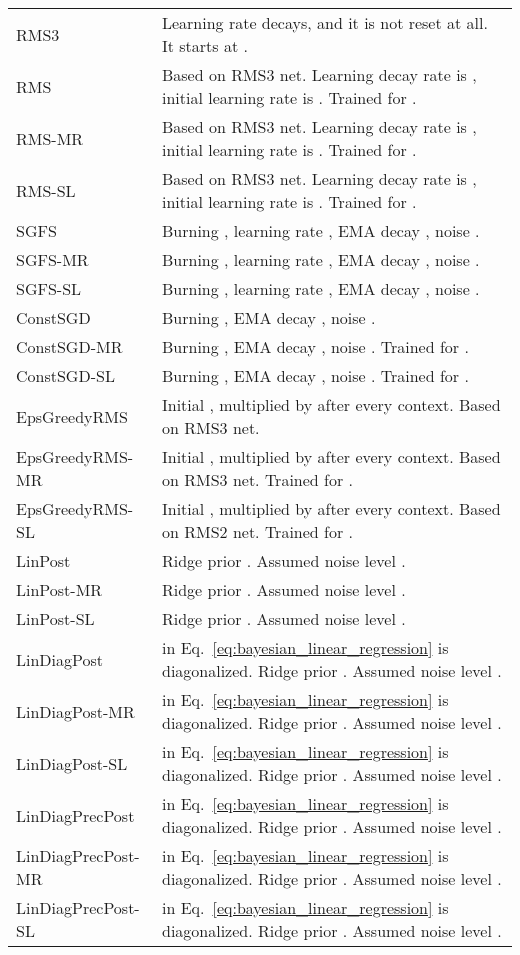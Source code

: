 \documentclass{article} \usepackage{iclr2018_conference,times}
\begin{document}
\begin{table}[ht]
\begin{adjustbox}{center}
\begin{tabular}{ll}
RMS3 & Learning rate decays, and it is not reset at all. It starts at . \\
RMS & Based on RMS3 net. Learning decay rate is , initial learning rate is . Trained for . \\
RMS-MR & Based on RMS3 net. Learning decay rate is , initial learning rate is . Trained for . \\
RMS-SL & Based on RMS3 net. Learning decay rate is , initial learning rate is . Trained for . \\
SGFS & Burning , learning rate , EMA decay , noise . \\
SGFS-MR & Burning , learning rate , EMA decay , noise . \\
SGFS-SL & Burning , learning rate , EMA decay , noise . \\
ConstSGD & Burning , EMA decay , noise . \\
ConstSGD-MR & Burning , EMA decay , noise . Trained for . \\
ConstSGD-SL & Burning , EMA decay , noise . Trained for . \\
EpsGreedyRMS & Initial , multiplied by  after every context. Based on RMS3 net. \\
EpsGreedyRMS-MR & Initial , multiplied by  after every context. Based on RMS3 net. Trained for . \\
EpsGreedyRMS-SL & Initial , multiplied by  after every context. Based on RMS2 net. Trained for . \\
LinPost & Ridge prior . Assumed noise level . \\
LinPost-MR & Ridge prior . Assumed noise level . \\
LinPost-SL & Ridge prior . Assumed noise level . \\
LinDiagPost &  in Eq.~\ref{eq:bayesian_linear_regression} is diagonalized.  Ridge prior . Assumed noise level . \\
LinDiagPost-MR &  in Eq.~\ref{eq:bayesian_linear_regression} is diagonalized.  Ridge prior . Assumed noise level . \\
LinDiagPost-SL &  in Eq.~\ref{eq:bayesian_linear_regression} is diagonalized.  Ridge prior . Assumed noise level . \\
LinDiagPrecPost &  in Eq.~\ref{eq:bayesian_linear_regression} is diagonalized.  Ridge prior . Assumed noise level . \\
LinDiagPrecPost-MR &  in Eq.~\ref{eq:bayesian_linear_regression} is diagonalized.  Ridge prior . Assumed noise level . \\
LinDiagPrecPost-SL &  in Eq.~\ref{eq:bayesian_linear_regression} is diagonalized.  Ridge prior . Assumed noise level . \\

\end{tabular}
\end{adjustbox}
\end{table}
\end{document}
